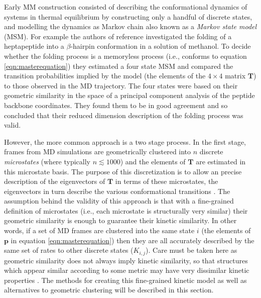 Early MM construction consisted of describing the conformational dynamics of systems in thermal equilibrium by constructing only a handful of discrete states, and modelling the dynamics as Markov chain also known as a \emph{Markov state model} (MSM). For example the authors of reference \cite{degrootEssentialDynamicsReversible2001} investigated the folding of a heptapeptide into a $\beta$-hairpin conformation in a solution of methanol.  To decide whether the folding process is a memoryless process (i.e., conforms to equation \ref{eqn:masterequation}) they estimated a four state MSM and compared the transition probabilities implied by the model (the elements of the $4\times 4$ matrix $\mathbf{T}$) to those observed in the MD trajectory. The four states were based on their geometric similarity in the space of a principal component analysis of the peptide backbone coordinates. They found them to be in good agreement and so concluded that their reduced dimension description of the folding process was valid. 

However, the more common approach \cite{husicMarkovStateModels2018, noeMarkovModelsMolecular2019b} is a two stage process. In the first stage, frames from MD simulations are  geometrically clustered into $n$ discrete \emph{microstates} (where typically $n \lesssim 1000$) and the elements of $\mathbf{T}$ are estimated in this microstate basis. The purpose of this discretization is to allow an precise description of the eigenvectors of $\mathbf{T}$ in terms of these microstates, the eigenvectors in turn describe the various conformational transitions \cite{perez-hernandezIdentificationSlowMolecular2013a}. The assumption behind the validity of this approach is that with a fine-grained definition of microstates (i.e., each microstate is structurally very similar) their geometric similarity is enough to guarantee their kinetic similarity.  In other words, if a set of MD frames are clustered into the same state $i$ (the elements of $\mathbf{p}$ in equation \ref{eqn:masterequation}) then they are all accurately described by the same set of rates to other discrete states ($K_{i, j}$). Care must be taken here as geometric similarity does not always imply kinetic similarity, so that structures which appear similar according to some metric may have very dissimilar kinetic properties \cite{bowmanUsingGeneralizedEnsemble2009a, krivovHiddenComplexityFree2004, noeTransitionNetworksModeling2008, berezovskaAccountingKineticsOrder2012}. The methods for creating this fine-grained kinetic model as well as alternatives to geometric clustering will be described in this section.

